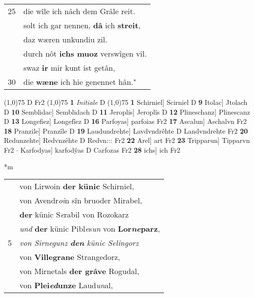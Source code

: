 \documentclass[8pt,a4paper,notitlepage]{article}
\begin{document}
\begin{table}[ht]
\begin{minipage}[t]{0.5\linewidth}
\begin{tabular}{rl}
25 & die wîle ich nâch dem Grâle reit.\\ 
 & solt ich gar nennen, \textbf{dâ} ich \textbf{streit},\\ 
 & daz wæren unkundiu zil.\\ 
 & durch nôt \textbf{ichs muoz} verswîgen vil.\\ 
 & swaz \textbf{ir} mir kunt ist getân,\\ 
30 & die \textbf{wæne} ich hie genennet hân."\\ 
\end{tabular}
\scriptsize
\line(1,0){75} \newline
D Fr2 \newline
\line(1,0){75} \newline
\textbf{1} \textit{Initiale} D  \newline
\line(1,0){75} \newline
\textbf{1} Schirniel] Scirniel D \textbf{9} Itolac] Jtolach D \textbf{10} Semblidac] Semblidach D \textbf{11} Jeroplis] Jeroplîs D \textbf{12} Plineschanz] Plinescanz D \textbf{13} Longefiez] Longefîez D \textbf{16} Parfoyas] parfoias Fr2 \textbf{17} Ascalun] Aschalvn Fr2 \textbf{18} Pranzile] Pranzîle D \textbf{19} Laudundrehte] Lavdvndrêhte D Landvndrehte Fr2 \textbf{20} Redunzehte] Redvnzêhte D Redvn::: Fr2 \textbf{22} Arel] art Fr2 \textbf{23} Tripparun] Tipparvn Fr2  $\cdot$ Karfodyas] karfodŷas D Carfozas Fr2 \textbf{28} ichs] ich Fr2 \newline
\end{minipage}
\hspace{0.5cm}
\begin{minipage}[t]{0.5\linewidth}
\small
\begin{center}*m
\end{center}
\begin{tabular}{rl}
 & von Lirwoin \textbf{der künic} Schirniel,\\ 
 & von Avendr\textit{oi}n sîn bruoder Mirabel,\\ 
 & \textbf{der} künic S\textit{e}rabil von Rozokarz\\ 
 & \textit{und} \textbf{der} künic Pibl\textit{e}s\textit{un} von \textbf{Lor\textit{ne}parz},\\ 
5 & \textit{von Sirnegunz \textbf{den} künic Selingorz}\\ 
 & von \textbf{Villegrane} Strangedorz,\\ 
 & von Mirnetals \textbf{der grâve} Rogudal,\\ 
 & von \textbf{Plei\textit{ed}unze} Laud\textit{un}al,\\ 

\end{tabular}
\end{minipage}
\end{table}
\end{document}
